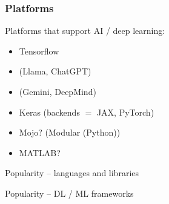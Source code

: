 \begin{frame}
    \frametitle{Platforms}
    
    Platforms that support AI / deep learning:

    \vspace{0.5em}
    \begin{itemize}
        \item Tensorflow
        \vspace{0.5em}
        \item {} (Llama, ChatGPT)
        \vspace{0.5em}
        \item {} (Gemini, DeepMind)
        \vspace{0.5em}
        \item Keras (backends $=$ JAX, PyTorch)
        \vspace{0.5em}
        \item Mojo? (Modular (Python))
        \vspace{0.5em}
        \item MATLAB? 
    \end{itemize}

\end{frame}




\begin{frame}
    
    Popularity -- languages and libraries
    
    \begin{figure}
       \begin{center}
       \end{center}
    \end{figure}

\end{frame}


\begin{frame}
    
    Popularity -- DL / ML frameworks
    
    \begin{figure}
       \begin{center}
       \end{center}
    \end{figure}

\end{frame}



